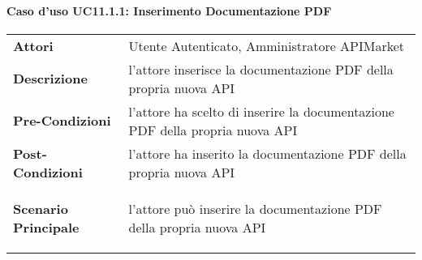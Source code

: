 \paragraph{Caso d'uso UC11.1.1: Inserimento Documentazione PDF}
\label{UC11.1.1}

\renewcommand*{\arraystretch}{1.6}
\begin{longtable}{ l | p{11cm}}
	\hline
	\rowcolor{Gray}
	\multicolumn{2}{c}{Caso d'uso UC11.1.1: Inserimento Documentazione PDF} \\
	\hline
	\textbf{Attori} &Utente Autenticato, Amministratore APIMarket \\
	\textbf{Descrizione} & l'attore inserisce la documentazione PDF della propria nuova API\\
	\textbf{Pre-Condizioni} &  l'attore ha scelto di inserire la documentazione PDF della propria nuova API\\
	\textbf{Post-Condizioni}&l'attore ha inserito la documentazione PDF della propria nuova API\\
	\textbf{Scenario Principale} & \begin{enumerate*}[label=(\arabic*.),itemjoin={\newline}]
		\item l'attore può inserire la documentazione PDF della propria nuova API
	\end{enumerate*}\\
\end{longtable}


